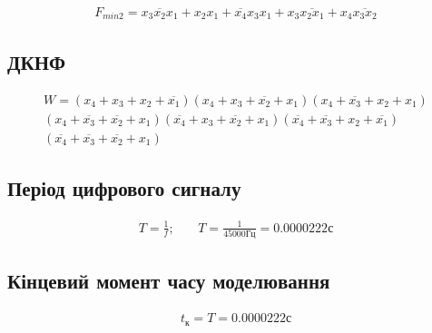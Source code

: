 \documentclass{article}
\begin{document}
\begin{normalsize}
	\begin{Large}
		\begin{gather}
			F_{min2}=\overline{x_3x_2x_1}+x_2x_1+\overline{x_4}x_3x_1+x_3\overline{x_2x_1}+x_4\overline{x_3x_2}\nonumber		
		\end{gather}
	\end{Large}

	\subsection*{ДКНФ} 
	\begin{Large}
		\begin{gather}
			W=(x_4+x_3+x_2+\overline{x_1})
			(x_4+x_3+\overline{x_2}+x_1)
			(x_4+\overline{x_3}+x_2+x_1)\nonumber\\
			(x_4+\overline{x_3}+\overline{x_2}+x_1)
			(\overline{x_4}+x_3+\overline{x_2}+x_1)
			(\overline{x_4}+\overline{x_3}+x_2+\overline{x_1})\nonumber\\
			(\overline{x_4}+\overline{x_3}+\overline{x_2}+x_1)\nonumber
		\end{gather}
	\end{Large}

	\subsection*{Період цифрового сигналу}
	\begin{Large}
		\begin{gather}
			T=\frac{1}{f};\hspace{22pt}T=\frac{1}{45000\text{Гц}}=0.0000222\text{с}\nonumber
		\end{gather}
	\end{Large}

	\subsection*{Кінцевий момент часу моделювання}
	\begin{Large}
		\begin{gather}
			t_\text{к}=T=0.0000222\text{с}\nonumber
		\end{gather}
	\end{Large}


\end{normalsize}
\end{document}
